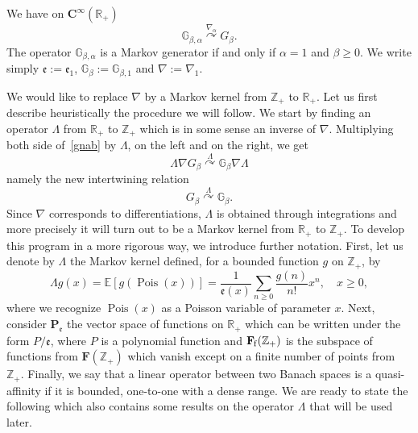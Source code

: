 \documentclass[AHL,Unicode,longabstracts]{cedram}
\DeclareMathOperator{\Pois}{Pois}
\newcommand{\df}{\mathrel{:=}}
\newcommand{\cC}{{\mathbf C}}
\newcommand{\EE}{\mathbb{E}}
\newcommand{\RR}{\mathbb{R}}
\newcommand{\ZZ}{\mathbb{Z}}
\newcommand{\fe}{\mathfrak{e}}
\newcommand{\iy}{\infty}
\newcommand{\na}{\nabla}
\newcommand{\dBg}{{\discret{G}}}
\newcommand{\Bg}{G}
\newcommand{\esP}{\mathbf{P}}
\newcommand{\esF}{\mathbf{F}}
\newcommand{\esPe}{\esP_{\! \fe}}
\newcommand{\esFf}{\esF_{\hskip-.3mm\mathrm{f}}}
\newcommand{\discret}[1]{\mathds{#1}}
\newcommand{\Gate}[3]{#1\stackrel{#2}{\curvearrowright}#3}
\begin{document}
\begin{lemm} \label{lem:gate_gen_B}
We have on $\cC^\iy(\RR_+)$
\begin{equation}\label{gnab}
\Gate{\dBg_{\beta,\alpha}}{\na_{\alpha}}{\Bg_{\beta}}.
\end{equation}
The operator $\dBg_{\beta,\alpha}$ is a Markov generator if and only if $\alpha=1$ and $\beta \geq 0$. We write simply $\fe\df\fe_1$, $\dBg_{\beta}\df\dBg_{\beta,1}$ and $\na\df\na_{1}$.
\end{lemm} We would like to replace $\na$ by a Markov kernel from $\ZZ_+$ to $\RR_+$. Let us first describe heuristically the procedure we will follow. We start by finding an operator $\Lambda$ from $\RR_+$ to $\ZZ_+$ which is in some sense an inverse of $\na$. Multiplying both side of~\eqref{gnab} by $\Lambda$, on the left and on the right, we get
\begin{equation}\label{b2}
\Gate{\Lambda\na
\Bg_{\beta}}{\Lambda}{\dBg_{\beta}\na\Lambda}
\end{equation}
namely the new intertwining relation
\begin{equation}\label{b3}
\Gate{\Bg_{\beta}}{\Lambda}{\dBg_{\beta}}.
\end{equation}
Since $\na$
corresponds to differentiations, $\Lambda$ is obtained through integrations and more precisely it will turn out to be a Markov kernel from $\RR_+$ to $\ZZ_+$. To develop this program in a more rigorous way, we introduce further notation. First, let us denote by $\Lambda$ the Markov kernel defined, for a bounded function $g$ on $\ZZ_+$, by
\begin{equation}\label{Lambda}
\Lambda g(x)=\EE[g(\Pois(x))]=\frac{1}{\fe(x)}\sum_{n\geq 0} \frac{g(n)}{n!} x^n, \quad x\geq 0,
\end{equation}
where we recognize $\Pois(x)$ as a Poisson variable of parameter $x$. Next, consider $\esPe$ the vector space of functions on $\RR_+$ which can be written under the form $P/\fe$, where $P$ is a polynomial function and $\esFf(\ZZ_+)$ is the subspace of functions from $\esF(\ZZ_+)$ which vanish except on a finite number of points from $\ZZ_+$. Finally, we say that a linear operator between two Banach spaces is a quasi-affinity if it is bounded, one-to-one with a dense range. We are ready to state the following which also contains some results on the operator $\Lambda$ that will be used later.
\end{document}
